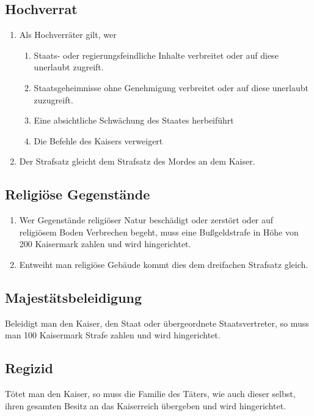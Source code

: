 \documentclass{article}
\begin{document}
\subsection{Hochverrat}
\begin{enumerate}[(1)]
    \item Als Hochverräter gilt, wer
    \begin{enumerate}[1.]
        \item Staats- oder regierungsfeindliche Inhalte verbreitet oder auf diese unerlaubt zugreift.
        \item Staatsgeheimnisse ohne Genehmigung verbreitet oder auf diese unerlaubt zuzugreift.
        \item Eine absichtliche Schwächung des Staates herbeiführt
        \item Die Befehle des Kaisers verweigert
    \end{enumerate}
    \item Der Strafsatz gleicht dem Strafsatz des Mordes an dem Kaiser.
\end{enumerate}

\subsection{Religiöse Gegenstände}
\begin{enumerate}[(1)]
    \item Wer Gegenstände religiöser Natur beschädigt oder zerstört oder auf religiösem Boden Verbrechen begeht, muss eine Bußgeldstrafe in Höhe von 200 Kaisermark zahlen und wird hingerichtet.
    \item Entweiht man religiöse Gebäude kommt dies dem dreifachen Strafsatz gleich.
\end{enumerate}

\subsection{Majestätsbeleidigung}
Beleidigt man den Kaiser, den Staat oder übergeordnete Staatsvertreter, so muss man 100 Kaisermark Strafe zahlen und wird hingerichtet.

\subsection{Regizid}
Tötet man den Kaiser, so muss die Familie des Täters, wie auch dieser selbst, ihren gesamten Besitz an das Kaiserreich übergeben und wird hingerichtet.
\end{document}
